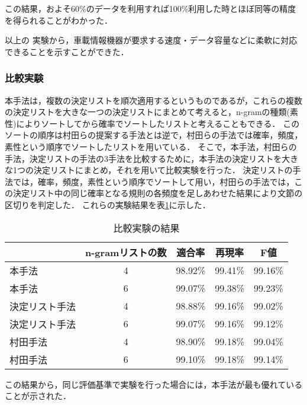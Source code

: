 この結果，およそ60\%のデータを利用すれば100\%利用した時とほぼ同等の精度を得られることがわかった．

以上の
実験から，車載情報機器が要求する速度・データ容量などに柔軟に対応できることを示すことができた．


\subsubsection{比較実験}\label{subsubsec:比較実験}

本手法は，複数の決定リストを順次適用するというものであるが，これらの複数の決定リストを大きな一つの決定リストにまとめて考えると，n-gramの種類(素性)によりソートしてから確率でソートしたリストと考えることもできる．
このソートの順序は村田らの提案する手法とは逆で，村田らの手法では確率，頻度，素性という順序でソートしたリストを用いている．
そこで，本手法，村田らの手法，決定リストの手法の3手法を比較するために，本手法の決定リストを大きな1つの決定リストにまとめ，それを用いて比較実験を行った．
決定リストの手法では，確率，頻度，素性という順序でソートして用い，村田らの手法では，この決定リスト中の同じ確率となる規則の各頻度を足しあわせた結果により文節の区切りを判定した．
これらの実験結果を表\ref{tab:比較実験}に示した．

\begin{table}
  \begin{center}
    \caption{比較実験の結果}
    
    
    
    \label{tab:比較実験}
    \begin{tabular}{l|c|c|c|c}
      & n-gramリストの数 & 適合率  & 再現率  & F値\\
      \hline
      本手法         & 4 & 98.92\% & 99.41\% & 99.16\%\\
      本手法         & 6 & 99.07\% & 99.38\% & 99.23\%\\
      決定リスト手法 & 4 & 98.88\% & 99.16\% & 99.02\%\\
      決定リスト手法 & 6 & 99.07\% & 99.16\% & 99.12\%\\
      村田手法       & 4 & 98.90\% & 99.18\% & 99.04\%\\
      村田手法       & 6 & 99.10\% & 99.18\% & 99.14\%\\
    \end{tabular}
  \end{center}
\end{table}

この結果から，同じ評価基準で実験を行った場合には，本手法が最も優れていることが示された．



